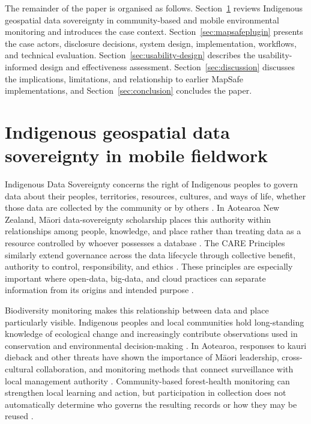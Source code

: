 \documentclass[]{interact}
\begin{document}
The remainder of the paper is organised as follows. Section~\ref{sec:case-study} reviews Indigenous geospatial data sovereignty in community-based and mobile environmental monitoring and introduces the case context. Section~\ref{sec:mapsafeplugin} presents the case actors, disclosure decisions, system design, implementation, workflows, and technical evaluation. Section~\ref{sec:usability-design} describes the usability-informed design and effectiveness assessment. Section~\ref{sec:discussion} discusses the implications, limitations, and relationship to earlier MapSafe implementations, and Section~\ref{sec:conclusion} concludes the paper.

\section{Indigenous geospatial data sovereignty in mobile fieldwork}
\label{sec:case-study}

Indigenous Data Sovereignty concerns the right of Indigenous peoples to govern data about their peoples, territories, resources, cultures, and ways of life, whether those data are collected by the community or by others \citep{kukutai2016indigenous,walter2021indigenous,rainie2019indigenous}. In Aotearoa New Zealand, Māori data-sovereignty scholarship places this authority within relationships among people, knowledge, and place rather than treating data as a resource controlled by whoever possesses a database \citep{kukutai2019mana,sporle2020indigenous,teManaRaraunga2018}. The CARE Principles similarly extend governance across the data lifecycle through collective benefit, authority to control, responsibility, and ethics \citep{carroll2020care,carroll2021operationalizing}. These principles are especially important where open-data, big-data, and cloud practices can separate information from its origins and intended purpose \citep{cormack2022indigenous,lovett2019gooddata,calac2025stewardship}.

Biodiversity monitoring makes this relationship between data and place particularly visible. Indigenous peoples and local communities hold long-standing knowledge of ecological change and increasingly contribute observations used in conservation and environmental decision-making \citep{reyes2022recognizing,forster2023amplifying}. In Aotearoa, responses to kauri dieback and other threats have shown the importance of Māori leadership, cross-cultural collaboration, and monitoring methods that connect surveillance with local management authority \citep{waipara2013surveillance,lambert2018indigenous,hill2021cross,greenaway2023positioning}. Community-based forest-health monitoring can strengthen local learning and action, but participation in collection does not automatically determine who governs the resulting records or how they may be reused \citep{lyver2017indigenous,massarella2020reproducing,wilson2025selfdetermination}.
\end{document}
